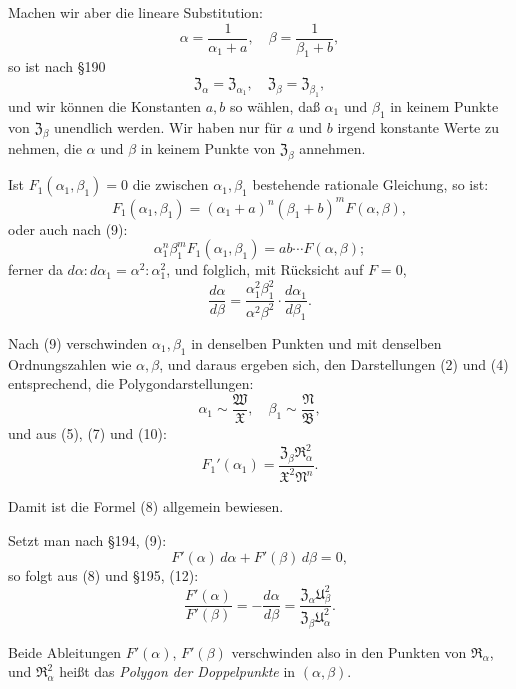 \documentclass[12pt,a4paper]{article}
\begin{document}
Machen wir aber die lineare Substitution:
\begin{equation}\label{eq:196-9}
\alpha = \frac{1}{\alpha_1 + a}, \quad \beta = \frac{1}{\beta_1 + b},
\end{equation}
so ist nach \S 190
\[
\mathfrak{Z}_\alpha = \mathfrak{Z}_{\alpha_1}, \quad \mathfrak{Z}_\beta = \mathfrak{Z}_{\beta_1},
\]
und wir können die Konstanten $a, b$ so wählen, daß $\alpha_1$ und $\beta_1$ in keinem Punkte von $\mathfrak{Z}_\beta$ unendlich werden. Wir haben nur für $a$ und $b$ irgend konstante Werte zu nehmen, die $\alpha$ und $\beta$ in keinem Punkte von $\mathfrak{Z}_\beta$ annehmen.

Ist $F_1(\alpha_1, \beta_1) = 0$ die zwischen $\alpha_1, \beta_1$ bestehende rationale Gleichung, so ist:
\[
F_1(\alpha_1, \beta_1) = (\alpha_1 + a)^n (\beta_1 + b)^m F(\alpha, \beta),
\]
oder auch nach (9):
\[
\alpha_1^n \beta_1^m F_1(\alpha_1, \beta_1) = ab \cdots F(\alpha, \beta);
\]
ferner da $d\alpha:d\alpha_1 = \alpha^2:\alpha_1^2$, und folglich, mit Rücksicht auf $F = 0$,
\begin{equation}\label{eq:196-10}
\frac{d\alpha}{d\beta} = \frac{\alpha_1^2 \beta_1^2}{\alpha^2 \beta^2} \cdot \frac{d\alpha_1}{d\beta_1}.
\end{equation}

Nach (9) verschwinden $\alpha_1, \beta_1$ in denselben Punkten und mit denselben Ordnungszahlen wie $\alpha, \beta$, und daraus ergeben sich, den Darstellungen (2) und (4) entsprechend, die Polygondarstellungen:
\begin{equation}\label{eq:196-11}
\alpha_1 \sim \frac{\mathfrak{W}}{\mathfrak{X}}, \quad \beta_1 \sim \frac{\mathfrak{N}}{\mathfrak{B}},
\end{equation}
und aus (5), (7) und (10):
\begin{equation}\label{eq:196-12}
F_1'(\alpha_1) = \frac{\mathfrak{Z}_\beta \mathfrak{R}_\alpha^2}{\mathfrak{X}^2 \mathfrak{N}^n}.
\end{equation}

Damit ist die Formel (8) allgemein bewiesen.

Setzt man nach \S 194, (9):
\[
F'(\alpha)\,d\alpha + F'(\beta)\,d\beta = 0,
\]
so folgt aus (8) und \S 195, (12):
\begin{equation}\label{eq:196-13}
\frac{F'(\alpha)}{F'(\beta)} = -\frac{d\alpha}{d\beta} = \frac{\mathfrak{Z}_\alpha \mathfrak{U}_\beta^2}{\mathfrak{Z}_\beta \mathfrak{U}_\alpha^2}.
\end{equation}

Beide Ableitungen $F'(\alpha)$, $F'(\beta)$ verschwinden also in den Punkten von $\mathfrak{R}_\alpha$, und $\mathfrak{R}_\alpha^2$ heißt das \emph{Polygon der Doppelpunkte} in $(\alpha, \beta)$.
\end{document}
